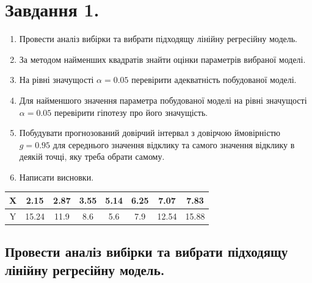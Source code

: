 \documentclass[a5paper, 20pt]{article}
\begin{document}
\section{Завдання 1.}

\begin{enumerate}

\item Провести аналіз вибірки та вибрати підходящу лінійну регресійну модель. 

\item За методом найменших квадратів знайти оцінки параметрів вибраної моделі.

\item На рівні значущості $\alpha = 0.05$ перевірити адекватність побудованої моделі. 

\item Для найменшого значення параметра побудованої моделі на рівні значущості $\alpha = 0.05$ перевірити гіпотезу про його значущість.

\item Побудувати прогнозований довірчий інтервал з довірчою ймовірністю $g = 0.95$ для середнього значення відклику та самого значення відклику в деякій точці, яку треба обрати самому.

\item Написати висновки.
\end{enumerate}

\begin{center}
\begin{tabular}{|c|c|c|c|c|c|c|c|} 
\hline
X & 2.15   & 2.87 & 3.55 & 5.14 & 6.25 &  7.07  &  7.83  \\ \hline
Y & 15.24 & 11.9 &  8.6  &  5.6  &  7.9  & 12.54 & 15.88 \\ \hline
\end{tabular}
\end{center}


\subsection{ Провести аналіз вибірки та вибрати підходящу лінійну регресійну модель. }
\end{document}
